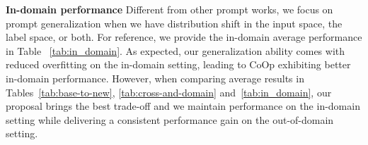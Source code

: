 \documentclass[10pt,twocolumn,letterpaper]{article}
\begin{document}
\begin{table}[t]
\centering
\caption{\textbf{In-domain performance.} CoOp provides the best in-domain performance, but suffers from distribution shifts. Our proposal provides the best trade-off.}
\vspace{-2mm}
\label{tab:in_domain}
\vspace{-1em}
\end{table}

\textbf{In-domain performance} Different from other prompt works, we focus on prompt generalization when we have distribution shift in the input space, the label space, or both. For reference, we provide the in-domain average performance in Table
~\ref{tab:in_domain}. As expected, our generalization ability comes with reduced overfitting on the in-domain setting, leading to CoOp exhibiting better in-domain performance. However, when comparing average results in Tables~\ref{tab:base-to-new}, \ref{tab:cross-and-domain} and~\ref{tab:in_domain}, our proposal brings the best trade-off and we maintain performance on the in-domain setting while delivering a consistent performance gain on the out-of-domain setting.
 \begin{table}[t!]
\centering
\caption{\textbf{Effect of variational formulation.} Formulating prompt learning as variational inference improves model generalization on unseen prompts compared to a non-Bayesian baseline~\cite{zhou2022learning}, for both the unconditional and conditional setting.}
\vspace{-2mm}
\label{tab:ablation-variational-formulation}
\end{table} 
\end{document}
